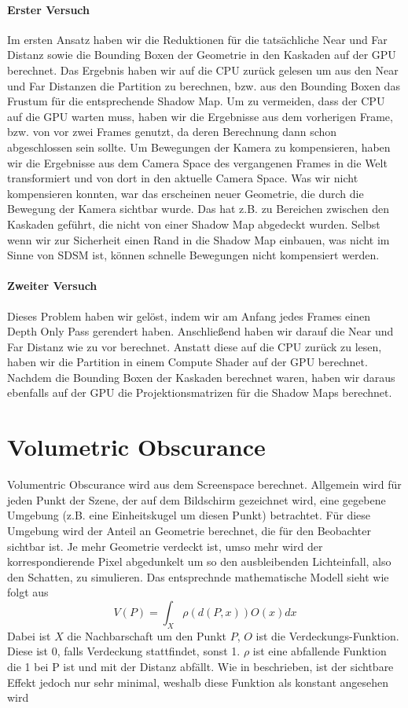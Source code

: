 \documentclass[runningheaders,a4paper]{llncs}
\begin{document}
\paragraph{Erster Versuch}
Im ersten Ansatz haben wir die Reduktionen für die tatsächliche Near und Far Distanz sowie die Bounding Boxen der Geometrie in den Kaskaden auf der GPU berechnet.
Das Ergebnis haben wir auf die CPU zurück gelesen um aus den Near und Far Distanzen die Partition zu berechnen, bzw. aus den Bounding Boxen das Frustum für die entsprechende Shadow Map.
Um zu vermeiden, dass der CPU auf die GPU warten muss, haben wir die Ergebnisse aus dem vorherigen Frame, bzw. von vor zwei Frames genutzt, da deren Berechnung dann schon abgeschlossen sein sollte.
Um Bewegungen der Kamera zu kompensieren, haben wir die Ergebnisse aus dem Camera Space des vergangenen Frames in die Welt transformiert und von dort in den aktuelle Camera Space.
Was wir nicht kompensieren konnten, war das erscheinen neuer Geometrie, die durch die Bewegung der Kamera sichtbar wurde.
Das hat z.B. zu Bereichen zwischen den Kaskaden geführt, die nicht von einer Shadow Map abgedeckt wurden.
Selbst wenn wir zur Sicherheit einen Rand in die Shadow Map einbauen, was nicht im Sinne von SDSM ist, können schnelle Bewegungen nicht kompensiert werden.

\paragraph{Zweiter Versuch}
Dieses Problem haben wir gelöst, indem wir am Anfang jedes Frames einen Depth Only Pass gerendert haben.
Anschließend haben wir darauf die Near und Far Distanz wie zu vor berechnet.
Anstatt diese auf die CPU zurück zu lesen, haben wir die Partition in einem Compute Shader auf der GPU berechnet.
Nachdem die Bounding Boxen der Kaskaden berechnet waren, haben wir daraus ebenfalls auf der GPU die Projektionsmatrizen für die Shadow Maps berechnet.




\section{Volumetric Obscurance}

Volumentric Obscurance wird aus dem Screenspace berechnet. Allgemein wird für jeden Punkt der Szene, der auf
dem Bildschirm gezeichnet wird, eine gegebene Umgebung (z.B. eine Einheitskugel um diesen Punkt) betrachtet.
Für diese Umgebung wird der Anteil an Geometrie berechnet, die für den Beobachter sichtbar ist. Je mehr Geometrie
verdeckt ist, umso mehr wird der korrespondierende Pixel abgedunkelt um so den ausbleibenden Lichteinfall,
also den Schatten, zu simulieren.
Das entsprechnde mathematische Modell sieht wie folgt aus \cite{voPaper}
$$
V(P) = \int_{X} \rho (d(P,x))O(x)dx
$$
Dabei ist $X$ die Nachbarschaft um den Punkt $P$, $O$ ist die Verdeckungs-Funktion. Diese
ist 0, falls Verdeckung stattfindet, sonst 1. $\rho$ ist eine abfallende Funktion
die 1 bei P ist und mit der Distanz abfällt. Wie in \cite{voPaper} beschrieben, ist der 
sichtbare Effekt jedoch nur sehr minimal, weshalb diese Funktion als konstant angesehen 
wird \cite{voPaper}
\end{document}
